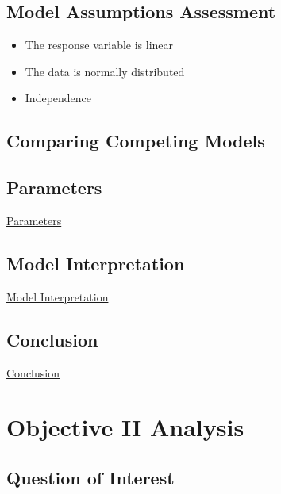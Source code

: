 \documentclass[american,]{article}
\providecommand{\tightlist}{%
  \setlength{\itemsep}{0pt}\setlength{\parskip}{0pt}}
\begin{document}
\newpage

\hypertarget{model-assumptions-assessment}{%
\subsection{Model Assumptions Assessment}\label{model-assumptions-assessment}}

\begin{itemize}
\tightlist
\item
  The response variable is linear
\item
  The data is normally distributed
\item
  Independence
\end{itemize}

\hypertarget{comparing-competing-models}{%
\subsection{Comparing Competing Models}\label{comparing-competing-models}}

\newpage

\hypertarget{parameters}{%
\subsection{Parameters}\label{parameters}}

\protect\hyperlink{parameters}{Parameters}

\hypertarget{model-interpretation}{%
\subsection{Model Interpretation}\label{model-interpretation}}

\protect\hyperlink{model-interpretation}{Model Interpretation}

\hypertarget{conclusion}{%
\subsection{Conclusion}\label{conclusion}}

\protect\hyperlink{conclusion-1}{Conclusion}

\newpage

\hypertarget{objective-ii-analysis}{%
\section{Objective II Analysis}\label{objective-ii-analysis}}

\hypertarget{question-of-interest-1}{%
\subsection{Question of Interest}\label{question-of-interest-1}}
\end{document}
